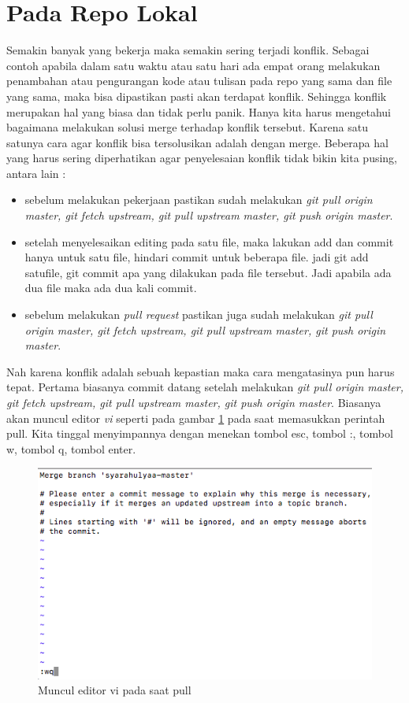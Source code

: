 \section{Pada Repo Lokal}
Semakin banyak yang bekerja maka semakin sering terjadi konflik. Sebagai contoh apabila dalam satu waktu atau satu hari ada empat orang melakukan penambahan atau pengurangan kode atau tulisan pada repo yang sama dan file yang sama, maka bisa dipastikan pasti akan terdapat konflik. Sehingga konflik merupakan hal yang biasa dan tidak perlu panik. Hanya kita harus mengetahui bagaimana melakukan solusi merge terhadap konflik tersebut. Karena satu satunya cara agar konflik bisa tersolusikan adalah dengan merge. Beberapa hal yang harus sering diperhatikan agar penyelesaian konflik tidak bikin kita pusing, antara lain :
\begin{itemize}
	\item sebelum melakukan pekerjaan pastikan sudah melakukan \textit{git pull origin master, git fetch upstream, git pull upstream master, git push origin master}.
	\item setelah menyelesaikan editing pada satu file, maka lakukan add dan commit hanya untuk satu file, hindari commit untuk beberapa file. jadi git add satufile, git commit apa yang dilakukan pada file tersebut. Jadi apabila ada dua file maka ada dua kali commit.
	\item sebelum melakukan \textit{pull request} pastikan juga sudah melakukan \textit{git pull origin master, git fetch upstream, git pull upstream master, git push origin master}.
\end{itemize}
Nah karena konflik adalah sebuah kepastian maka cara mengatasinya pun harus tepat. Pertama biasanya commit datang setelah melakukan \textit{git pull origin master, git fetch upstream, git pull upstream master, git push origin master}. 
Biasanya akan muncul editor \textit{vi} seperti pada gambar \ref{fig:editorvimergesimpan} pada saat memasukkan perintah pull. Kita tinggal menyimpannya dengan menekan tombol esc, tombol :, tombol w, tombol q, tombol enter.

\begin{figure}[!htbp]
\centerline{\includegraphics[width=.75\textwidth]{Figures/editorvimergesimpan}}
\caption{Muncul editor vi pada saat pull}
\label{fig:editorvimergesimpan}
\end{figure}

